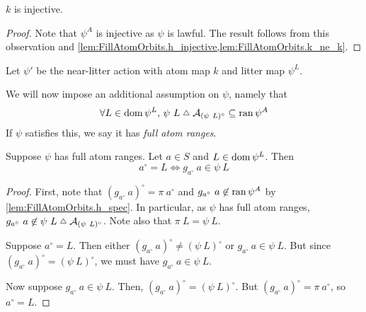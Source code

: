 \begin{lemma}
    \( k \) is injective.
\end{lemma}
\begin{proof}
    Note that \( \psi^A \) is injective as \( \psi \) is lawful.
    The result follows from this observation and \cref{lem:FillAtomOrbits.h_injective,lem:FillAtomOrbits.k_ne_k}.
\end{proof}
\begin{definition}
    Let \( \psi' \) be the near-litter action with atom map \( k \) and litter map \( \psi^L \).
\end{definition}
We will now impose an additional assumption on \( \psi \), namely that
\[ \forall L \in \dom \psi^L,\, \psi\ L \symmdiff \mathcal A_{(\psi\ L)^\circ} \subseteq \ran \psi^A \]
If \( \psi \) satisfies this, we say it has \emph{full atom ranges}.
\begin{lemma}
    Suppose \( \psi \) has full atom ranges.
    Let \( a \in S \) and \( L \in \operatorname{dom} \psi^L \).
    Then
    \[ a^\circ = L \Leftrightarrow g_{a^\circ}\ a \in \psi\ L \]
\end{lemma}
\begin{proof}
    First, note that \( (g_{a^\circ}\ a)^\circ = \pi\ a^\circ \) and \( g_{a^\circ}\ a \not\in \operatorname{ran} \psi^A \) by \cref{lem:FillAtomOrbits.h_spec}.
    In particular, as \( \psi \) has full atom ranges, \( g_{a^\circ}\ a \not\in \psi\ L \symmdiff \mathcal A_{(\psi\ L)^\circ} \).
    Note also that \( \pi\ L = \psi\ L \).

    Suppose \( a^\circ = L \).
    Then either \( (g_{a^\circ}\ a)^\circ \neq (\psi\ L)^\circ \) or \( g_{a^\circ}\ a \in \psi\ L \).
    But since \( (g_{a^\circ}\ a)^\circ = (\psi\ L)^\circ \), we must have \( g_{a^\circ}\ a \in \psi\ L \).

    Now suppose \( g_{a^\circ}\ a \in \psi\ L \).
    Then, \( (g_{a^\circ}\ a)^\circ = (\psi\ L)^\circ \).
    But \( (g_{a^\circ}\ a)^\circ = \pi\ a^\circ \), so \( a^\circ = L \).
\end{proof}
